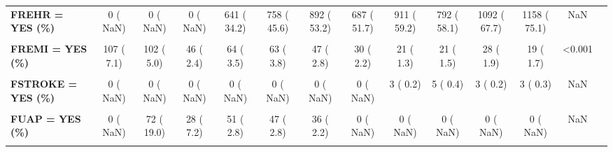 \documentclass[
]{article}
\begin{document}
\begin{table}[H]
\begin{tabular}[t]{>{\raggedright\arraybackslash}p{5em}ccccccccccccc}
\textbf{FREHR = YES (\%)} & 0 (  NaN) & 0 (  NaN) & 0 (  NaN) & 641 ( 34.2) & 758 ( 45.6) & 892 ( 53.2) & 687 ( 51.7) & 911 ( 59.2) & 792 ( 58.1) & 1092 ( 67.7) & 1158 ( 75.1) & NaN & \\
\textbf{\cellcolor{gray!10}{FREHT = YES (\%)}} & \cellcolor{gray!10}{139 (  7.8)} & \cellcolor{gray!10}{129 (  6.3)} & \cellcolor{gray!10}{75 (  3.6)} & \cellcolor{gray!10}{185 ( 53.3)} & \cellcolor{gray!10}{113 ( 40.6)} & \cellcolor{gray!10}{112 ( 47.5)} & \cellcolor{gray!10}{56 ( 50.5)} & \cellcolor{gray!10}{76 ( 57.1)} & \cellcolor{gray!10}{59 ( 43.7)} & \cellcolor{gray!10}{73 ( 44.0)} & \cellcolor{gray!10}{48 ( 32.7)} & \cellcolor{gray!10}{<0.001} & \cellcolor{gray!10}{}\\
\textbf{FREMI = YES (\%)} & 107 (  7.1) & 102 (  5.0) & 46 (  2.4) & 64 (  3.5) & 63 (  3.8) & 47 (  2.8) & 30 (  2.2) & 21 (  1.3) & 21 (  1.5) & 28 (  1.9) & 19 (  1.7) & <0.001 & \\
\textbf{\cellcolor{gray!10}{FSTAT = YES (\%)}} & \cellcolor{gray!10}{0 (  NaN)} & \cellcolor{gray!10}{0 (  NaN)} & \cellcolor{gray!10}{0 (  NaN)} & \cellcolor{gray!10}{0 (  NaN)} & \cellcolor{gray!10}{1512 ( 92.6)} & \cellcolor{gray!10}{1559 ( 95.0)} & \cellcolor{gray!10}{1240 ( 91.5)} & \cellcolor{gray!10}{1483 ( 99.3)} & \cellcolor{gray!10}{1280 ( 98.8)} & \cellcolor{gray!10}{1224 ( 83.3)} & \cellcolor{gray!10}{933 ( 86.2)} & \cellcolor{gray!10}{NaN} & \cellcolor{gray!10}{}\\
\textbf{FSTROKE = YES (\%)} & 0 (  NaN) & 0 (  NaN) & 0 (  NaN) & 0 (  NaN) & 0 (  NaN) & 0 (  NaN) & 0 (  NaN) & 3 (  0.2) & 5 (  0.4) & 3 (  0.2) & 3 (  0.3) & NaN & \\
\textbf{\cellcolor{gray!10}{FTIMI (mean (SD))}} & \cellcolor{gray!10}{NaN (NA)} & \cellcolor{gray!10}{NaN (NA)} & \cellcolor{gray!10}{NaN (NA)} & \cellcolor{gray!10}{2.77 (0.66)} & \cellcolor{gray!10}{2.78 (0.65)} & \cellcolor{gray!10}{2.84 (0.60)} & \cellcolor{gray!10}{2.73 (0.80)} & \cellcolor{gray!10}{2.79 (0.66)} & \cellcolor{gray!10}{2.81 (0.63)} & \cellcolor{gray!10}{2.86 (0.52)} & \cellcolor{gray!10}{2.86 (0.52)} & \cellcolor{gray!10}{0.002} & \cellcolor{gray!10}{}\\
\textbf{FUAP = YES (\%)} & 0 (  NaN) & 72 ( 19.0) & 28 (  7.2) & 51 (  2.8) & 47 (  2.8) & 36 (  2.2) & 0 (  NaN) & 0 (  NaN) & 0 (  NaN) & 0 (  NaN) & 0 (  NaN) & NaN & \\
\textbf{\cellcolor{gray!10}{FUAPH = YES (\%)}} & \cellcolor{gray!10}{0 (  NaN)} & \cellcolor{gray!10}{72 (100.0)} & \cellcolor{gray!10}{28 (  7.2)} & \cellcolor{gray!10}{29 ( 63.0)} & \cellcolor{gray!10}{35 ( 77.8)} & \cellcolor{gray!10}{31 ( 86.1)} & \cellcolor{gray!10}{0 (  NaN)} & \cellcolor{gray!10}{0 (  NaN)} & \cellcolor{gray!10}{0 (  NaN)} & \cellcolor{gray!10}{0 (  NaN)} & \cellcolor{gray!10}{0 (  NaN)} & \cellcolor{gray!10}{NaN} & \cellcolor{gray!10}{}\\

\end{tabular}
\end{table}
\end{document}
